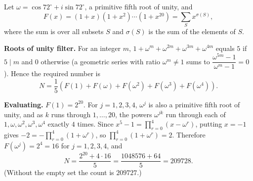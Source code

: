 Let $\omega=\cos72^\circ+i\sin72^\circ$, a primitive fifth root of unity, and
\[
F(x)=(1+x)(1+x^2)\cdots(1+x^{20})=\sum_{S}x^{\sigma(S)},
\]
where the sum is over all subsets $S$ and $\sigma(S)$ is the sum of the elements of $S$.

\textbf{Roots of unity filter.} For an integer $m$, $1+\omega^m+\omega^{2m}+\omega^{3m}+\omega^{4m}$ equals $5$ if $5\mid m$ and $0$ otherwise (a geometric series with ratio $\omega^m\ne1$ sums to $\dfrac{\omega^{5m}-1}{\omega^m-1}=0$). Hence the required number is
\[
N=\dfrac{1}{5}\left(F(1)+F(\omega)+F(\omega^2)+F(\omega^3)+F(\omega^4)\right).
\]

\textbf{Evaluating.} $F(1)=2^{20}$. For $j=1,2,3,4$, $\omega^j$ is also a primitive fifth root of unity, and as $k$ runs through $1,\dots,20$, the powers $\omega^{jk}$ run through each of $1,\omega,\omega^2,\omega^3,\omega^4$ exactly $4$ times. Since $x^5-1=\prod_{r=0}^{4}(x-\omega^r)$, putting $x=-1$ gives $-2=-\prod_{r=0}^{4}(1+\omega^r)$, so $\prod_{r=0}^{4}(1+\omega^r)=2$. Therefore $F(\omega^j)=2^4=16$ for $j=1,2,3,4$, and
\[
N=\dfrac{2^{20}+4\cdot16}{5}=\dfrac{1048576+64}{5}=\boxed{209728}.
\]
(Without the empty set the count is $209727$.)
